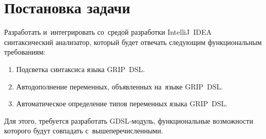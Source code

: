 \section{Постановка задачи} \label{sub21}

Разработать и~интегрировать со~средой разработки IntelliJ~IDEA синтаксический анализатор, который будет отвечать следующим функциональным требованиям:

\begin{enumerate} 
\item{Подсветка синтаксиса языка GRIP~DSL.}
\item{Автодополнение переменных, объявленных на~языке GRIP~DSL.}
\item{Автоматическое определение типов переменных языка GRIP~DSL.}
\end{enumerate} 

Для этого, требуется разработать GDSL-модуль, функциональные возможности которого будут совпадать с~вышеперечисленными. 